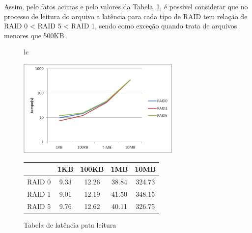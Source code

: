 	Assim, pelo fatos acimas e pelo valores da Tabela~\ref{tab:latencia_l}, é possível considerar que no processo de leitura do arquivo a latência para cada tipo de RAID tem relação de RAID 0 < RAID 5 < RAID 1, sendo como exceção quando trata de arquivos menores que 500KB.
	\\
	
	\begin{figure}[h]
		\begin{tabular}{lc}
			\begin{minipage}{.50\textwidth}
				\begin{center}
					
					\includegraphics[clip,width=8.0cm]{images/resultados/latencia_leitura.png}
					\caption{Gráfico de latência pata leitura}
					\label{fig:latencia_l}
					
				\end{center}
				
			\end{minipage}
			
			\begin{minipage}{.5\textwidth}
				\makeatletter
				\def\@captype{table}
				\makeatother
				\caption{Tabela de latência pata leitura}
				\label{tab:latencia_l}
				\begin{center}
					\begin{tabular}{|c|c|c|c|c|} \hline
								& 1KB  & 100KB & 1MB   & 10MB  \\ \hline
						RAID 0	& 9.33 & 12.26 & 38.84 & 324.73\\ \hline
						RAID 1	& 9.01 & 12.19 & 41.50 & 348.15\\ \hline
						RAID 5	& 9.76 & 12.62 & 40.11 & 326.75\\ \hline
						
						
					\end{tabular}
				\end{center}
				
			\end{minipage}
		\end{tabular}
	\end{figure}
	
